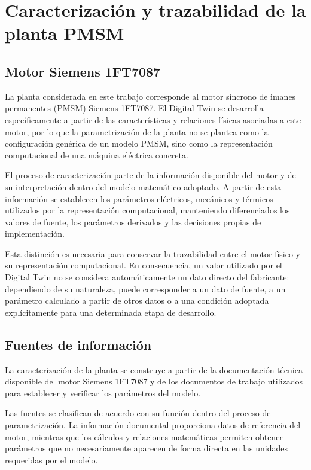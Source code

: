 \section{Caracterización y trazabilidad de la planta PMSM}

\subsection{Motor Siemens 1FT7087}

La planta considerada en este trabajo corresponde al motor síncrono de imanes permanentes (PMSM) Siemens 1FT7087. El Digital Twin se desarrolla específicamente a partir de las características y relaciones físicas asociadas a este motor, por lo que la parametrización de la planta no se plantea como la configuración genérica de un modelo PMSM, sino como la representación computacional de una máquina eléctrica concreta.

El proceso de caracterización parte de la información disponible del motor y de su interpretación dentro del modelo matemático adoptado. A partir de esta información se establecen los parámetros eléctricos, mecánicos y térmicos utilizados por la representación computacional, manteniendo diferenciados los valores de fuente, los parámetros derivados y las decisiones propias de implementación.

Esta distinción es necesaria para conservar la trazabilidad entre el motor físico y su representación computacional. En consecuencia, un valor utilizado por el Digital Twin no se considera automáticamente un dato directo del fabricante: dependiendo de su naturaleza, puede corresponder a un dato de fuente, a un parámetro calculado a partir de otros datos o a una condición adoptada explícitamente para una determinada etapa de desarrollo.

\subsection{Fuentes de información}

La caracterización de la planta se construye a partir de la documentación técnica disponible del motor Siemens 1FT7087 y de los documentos de trabajo utilizados para establecer y verificar los parámetros del modelo.

Las fuentes se clasifican de acuerdo con su función dentro del proceso de parametrización. La información documental proporciona datos de referencia del motor, mientras que los cálculos y relaciones matemáticas permiten obtener parámetros que no necesariamente aparecen de forma directa en las unidades requeridas por el modelo.

